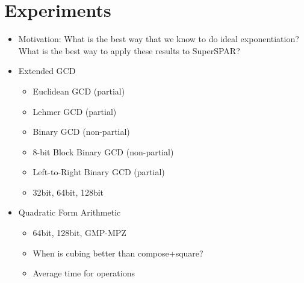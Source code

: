 \documentclass[11pt, letterpaper]{article}
\theoremstyle{definition}
\begin{document}
\bigbreak
\section{Experiments}

\begin{itemize}
\item Motivation: What is the best way that we know to do ideal exponentiation?  What is the best way to apply these results to SuperSPAR?

\item Extended GCD
	\begin{itemize}
	\item Euclidean GCD (partial)
	\item Lehmer GCD (partial)
	\item Binary GCD (non-partial)
	\item 8-bit Block Binary GCD (non-partial)
	\item Left-to-Right Binary GCD (partial)
	\item 32bit, 64bit, 128bit
	\end{itemize}
	
	
\item Quadratic Form Arithmetic
	\begin{itemize}
	\item 64bit, 128bit, GMP-MPZ
	\item When is cubing better than compose+square?
	\item Average time for operations
	\end{itemize}	
	

\end{itemize}
\end{document}
